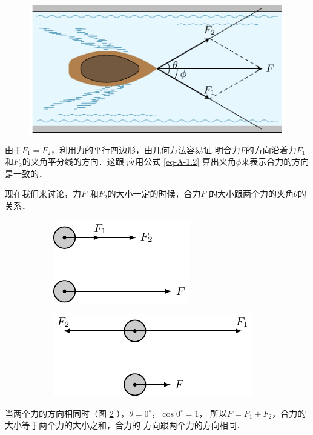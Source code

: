 \begin{figure} [htp]
\centering
\includegraphics{fig/A/1-25.pdf} 
\caption{} \label{fig_A_1-25} 
\end{figure} 

    由于$F_1=F_2$，利用力的平行四边形，由几何方法容易证
明合力$F$的方向沿着力$F_1$和$F_2$的夹角平分线的方向．这跟
应用公式 \eqref{eq-A-1.2} 算出夹角$\phi$来表示合力的方向是一致的．

    现在我们来讨论，力$F_1$和$F_2$的大小一定的时候，合力$F$
的大小跟两个力的夹角$\theta$的关系．

\begin{figure} [htp]
\begin{subfigure} {0.46\linewidth} 
	\centering
	\includegraphics{fig/A/1-26a.pdf} 
	\caption{} \label{fig_A_1-26a} 
\end{subfigure} 
\hfil
\begin{subfigure} {0.46\linewidth} 
	\centering
	\includegraphics{fig/A/1-26b.pdf} 
	\caption{} \label{fig_A_1-26b} 
\end{subfigure} 
\caption{} \label{fig_A_1-26} 
\end{figure} 

    当两个力的方向相同时（图 \ref{fig_A_1-26a} ），$\theta =0^\circ$，$\cos 0^\circ=1$，
所以$F=F_1+F_2$，合力的大小等于两个力的大小之和，合力的
方向跟两个力的方向相同．


